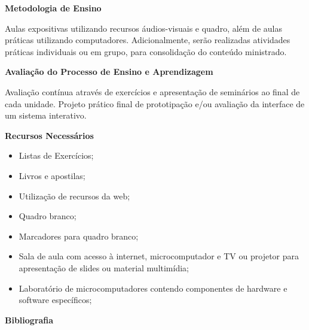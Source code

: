 \begin{snugshade}\begin{center}\textbf{
    Metodologia de Ensino
}\end{center}\end{snugshade}

\noindent
Aulas expositivas utilizando recursos áudios-visuais e quadro, além de aulas práticas utilizando computadores. Adicionalmente, serão realizadas atividades práticas individuais ou em grupo, para consolidação do conteúdo ministrado.

\begin{snugshade}\begin{center}\textbf{
    Avaliação do Processo de Ensino e Aprendizagem
}\end{center}\end{snugshade}

\noindent
Avaliação contínua através de exercícios e apresentação de seminários ao final de cada unidade.  Projeto prático final de prototipação e/ou avaliação da interface de um sistema interativo.

\begin{snugshade}\begin{center}\textbf{
    Recursos Necessários
    \vphantom{q} %
}\end{center}\end{snugshade}

\begin{itemize}
  \item Listas de Exercícios;
  \item Livros e apostilas;
  \item Utilização de recursos da web;
  \item Quadro branco;
  \item Marcadores para quadro branco;
  \item Sala de aula com acesso à internet, microcomputador e TV ou projetor para apresentação de slides ou material multimídia;
  \item Laboratório de microcomputadores contendo componentes de hardware e software específicos;
\end{itemize}


\begin{snugshade}\begin{center}\textbf{
    Bibliografia
}\end{center}\end{snugshade}

